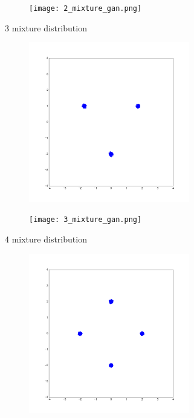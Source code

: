 \documentclass[dvipdfmx,12pt,unicode]{beamer}
\begin{document}
\begin{frame}
  \begin{figure}[htb]
    \begin{center}
      \texttt{[image: 2\_mixture\_gan.png]}
    \end{center}
  \end{figure}
  
\end{frame}

\begin{frame}{3 mixture distribution}
  \begin{figure}[htb]
    \begin{center}
      \includegraphics[height=7cm]{3_mixture_true.png}
    \end{center}
  \end{figure}
\end{frame}

\begin{frame}
  \begin{figure}[htb]
    \begin{center}
      \texttt{[image: 3\_mixture\_gan.png]}
    \end{center}
  \end{figure}
\end{frame}

\begin{frame}{4 mixture distribution}
  \begin{figure}[htb]
    \begin{center}
      \includegraphics[height=7cm]{4_mixture_true.png}
    \end{center}
  \end{figure}
\end{frame}
\end{document}
